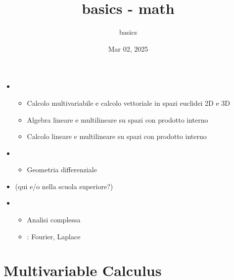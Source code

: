\documentclass[letterpaper,10pt,english]{jupyterBook}
\title{basics - math}
\date{Mar 02, 2025}
\author{basics}
\begin{document}
\pagestyle{empty}
\sphinxmaketitle
\pagestyle{plain}
\sphinxtableofcontents
\pagestyle{normal}
\label{\detokenize{intro::doc}}


\sphinxAtStartPar
{}
\begin{itemize}
\item {} 
\sphinxAtStartPar
{}
\begin{itemize}
\item {} 
\sphinxAtStartPar
Calcolo multivariabile e calcolo vettoriale in spazi euclidei 2D e 3D

\item {} 
\sphinxAtStartPar
Algebra lineare e multilineare su spazi con prodotto interno

\item {} 
\sphinxAtStartPar
Calcolo lineare e multilineare su spazi con prodotto interno

\end{itemize}

\item {} 
\sphinxAtStartPar
{}
\begin{itemize}
\item {} 
\sphinxAtStartPar
Geometria differenziale

\end{itemize}

\item {} 
\sphinxAtStartPar
{} (qui e/o nella scuola superiore?)

\item {} 
\sphinxAtStartPar
{}
\begin{itemize}
\item {} 
\sphinxAtStartPar
Analisi complessa

\item {} 
\sphinxAtStartPar
{}: Fourier, Laplace

\end{itemize}

\end{itemize}

\sphinxstepscope


\part{Multivariable Calculus}

\sphinxstepscope
\end{document}
